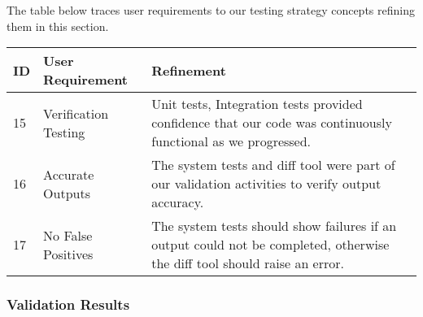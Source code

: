 \documentclass[11pt]{article}
\begin{document}

    The table below traces user requirements to our testing strategy concepts refining them in this section.
    \begin{table}[htbp]
        \centering
        \begin{tabularx}{\textwidth}{| l | l | X |}
            \hline
            \textbf{ID} & \textbf{User Requirement} & \textbf{Refinement} \\
            \hline
            15 & Verification Testing & Unit tests, Integration tests provided confidence that our code was continuously functional as we progressed. \\ \hline
            16 & Accurate Outputs & The system tests and diff tool were part of our validation activities to verify output accuracy. \\ \hline
            17 & No False Positives & The system tests should show failures if an output could not be completed, otherwise the diff tool should raise an error. \\ \hline
        \end{tabularx}\label{tab:test-strat-table}
    \end{table}
    \newpage
    \subsubsection{Validation Results}\label{subsubsec:test-validation}


    \newpage
\end{document}
